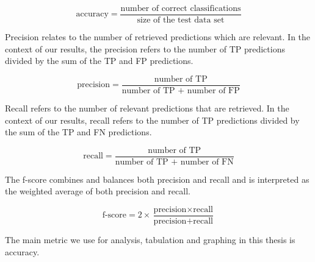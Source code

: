 \[ \text{accuracy} = \frac{\text{number of correct classifications}}{\text{size of the test data set}}\]

Precision relates to the number of retrieved predictions which are relevant. In the context of our results, the precision refers to the number of TP predictions 
divided by the sum of the TP and FP predictions.

\[ \text{precision} = \frac{\text{number of TP}}{\text{number of TP + number of FP}}\]

Recall refers to the number of relevant predictions that are retrieved. In the context of our results, recall refers to the number of TP predictions 
divided by the sum of the TP and FN predictions.

\[ \text{recall} = \frac{\text{number of TP}}{\text{number of TP + number of FN}}\]

The f-score combines and balances both precision and recall and is interpreted as the weighted average of both precision and recall. 

\[ \text{f-score} = 2 \times \frac{\text{precision} \times \text{recall}}{\text{precision} + \text{recall}}\]

The main metric we use for analysis, tabulation and graphing in this thesis is accuracy.

